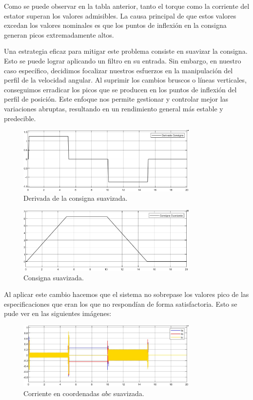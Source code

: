 \documentclass{article}
\begin{document}
Como se puede observar en la tabla anterior, tanto el torque como la corriente del estator
superan los valores admisibles. La causa principal de que estos valores excedan los valores nominales 
es que los puntos de inflexión en la consigna generan picos extremadamente altos.

Una estrategia eficaz para mitigar este problema consiste en suavizar la consigna. Esto se puede lograr 
aplicando un filtro en su entrada. Sin embargo, en nuestro caso específico, decidimos focalizar nuestros 
esfuerzos en la manipulación del perfil de la velocidad angular. Al suprimir los cambios bruscos o líneas 
verticales, conseguimos erradicar los picos que se producen en los puntos de inflexión del perfil de 
posición. Este enfoque nos permite gestionar y controlar mejor las variaciones abruptas, resultando en 
un rendimiento general más estable y predecible.

\begin{figure}[H]
    \centering
    \includegraphics[width=0.8\textwidth]{5.2..5.1.a.1.png}
    \caption{Derivada de la consigna suavizada.}
\end{figure}

\begin{figure}[H]
    \centering
    \includegraphics[width=0.8\textwidth]{5.2..5.1.a.2.png}
    \caption{Consigna suavizada.}
\end{figure}

Al aplicar este cambio hacemos que el sistema no sobrepase los valores pico de las especificaciones
que eran los que no respondían de forma satisfactoria. Esto se pude ver en las siguientes imágenes:

\begin{figure}[H]
    \centering
    \includegraphics[width=0.8\textwidth]{5.2..5.1.a.4.png}
    \caption{Corriente en coordenadas $abc$ suavizada.}
\end{figure}
\end{document}
